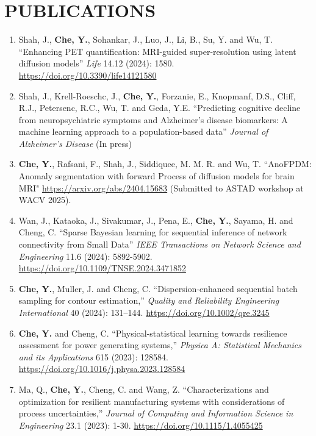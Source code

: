 \documentclass[10pt]{article}
\begin{document}
\section*{PUBLICATIONS}
\begin{enumerate}
	\item Shah, J., {\bf Che, Y.}, Sohankar, J., Luo, J., Li, B., Su, Y. and Wu, T. ``Enhancing PET quantification: MRI-guided super-resolution using latent diffusion models'' \textit{Life} 14.12 (2024): 1580. \url{https://doi.org/10.3390/life14121580}
	
	\item Shah, J., Krell-Roeschc, J., {\bf Che, Y.}, Forzanie, E., Knopmanf, D.S., Cliff, R.J., Petersenc, R.C., Wu, T. and Geda, Y.E. ``Predicting cognitive decline from neuropsychiatric symptoms and Alzheimer’s disease biomarkers: A machine learning approach to a population-based data'' \textit{Journal of Alzheimer's Disease} (In press)
	
	\item {\bf Che, Y.}, Rafsani, F., Shah, J., Siddiquee, M. M. R. and Wu, T. ``AnoFPDM: Anomaly segmentation with forward Process of diffusion models for brain MRI" \url{https://arxiv.org/abs/2404.15683} (Submitted to ASTAD workshop at WACV 2025).

	\item Wan, J., Kataoka, J., Sivakumar, J., Pena, E., {\bf Che, Y.}, Sayama, H. and Cheng, C. ``Sparse Bayesian learning for sequential inference of network connectivity from Small Data'' \textit{IEEE Transactions on Network Science and Engineering} 11.6 (2024): 5892-5902. \url{https://doi.org/10.1109/TNSE.2024.3471852}
	
	\item {\bf Che, Y.}, Muller, J. and Cheng, C. ``Dispersion-enhanced sequential batch sampling for contour estimation,'' \textit{Quality and Reliability Engineering International} 40 (2024): 131–144. \url{https://doi.org/10.1002/qre.3245} 

	\item {\bf Che, Y.} and Cheng, C. ``Physical-statistical learning towards resilience assessment for power generating systems,'' \textit{Physica A: Statistical Mechanics and its Applications} 615 (2023): 128584. \url{https://doi.org/10.1016/j.physa.2023.128584}

	\item Ma, Q., {\bf Che, Y.}, Cheng, C. and Wang, Z. ``Characterizations and optimization for resilient manufacturing systems with considerations of process uncertainties,'' \textit{Journal of Computing and Information Science in Engineering} 23.1 (2023): 1-30. \url{ https://doi.org/10.1115/1.4055425}


\end{enumerate}
\end{document}
